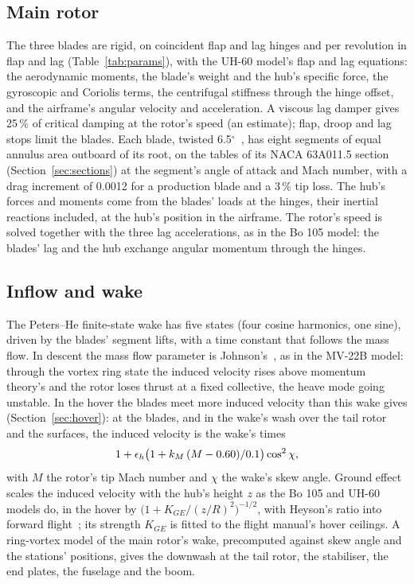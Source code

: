 \documentclass[10pt,a4paper,twocolumn]{article}
\begin{document}
\subsection{Main rotor}
The three blades are rigid, on coincident flap and lag hinges \NuFlap{} and \NuLag{} per revolution in flap and lag
(Table~\ref{tab:params}), with the UH-60 model's flap and lag equations: the aerodynamic moments, the blade's weight and the hub's
specific force, the gyroscopic and Coriolis terms, the centrifugal stiffness through the hinge offset, and the airframe's angular
velocity and acceleration. A viscous lag damper gives 25\,\% of critical damping at the rotor's speed (an estimate); flap, droop and lag
stops limit the blades. Each blade, twisted 6.5$^\circ$~\cite{hl}, has eight segments of equal annulus area outboard of its root, on the
tables of its NACA 63A011.5 section (Section~\ref{sec:sections}) at the segment's angle of attack and Mach number, with a drag
increment of 0.0012 for a production blade and a 3\,\% tip loss.
The hub's forces and moments come from the blades' loads at the hinges, their inertial reactions included, at the hub's position in the
airframe. The rotor's speed is solved together with the three lag accelerations, as in the Bo 105 model: the blades' lag and the hub
exchange angular momentum through the hinges.

\subsection{Inflow and wake}
The Peters--He finite-state wake has five states (four cosine harmonics, one sine), driven by the blades' segment lifts, with a time
constant that follows the mass flow. In descent the mass flow parameter is Johnson's~\cite{johnson}, as in the MV-22B model: through the
vortex ring state the induced velocity rises above momentum theory's and the rotor loses thrust at a fixed collective, the heave mode
going unstable. In the hover the blades meet more induced velocity than this wake gives (Section~\ref{sec:hover}): at the blades, and in
the wake's wash over the tail rotor and the surfaces, the induced velocity is the wake's times
\begin{equation*}
1+\epsilon_h\bigl(1+k_M\,(M-0.60)/0.1\bigr)\cos^2\chi ,
\end{equation*}
with $M$ the rotor's tip Mach number and $\chi$ the wake's skew angle. Ground effect scales the induced velocity with the hub's height
$z$ as the Bo 105 and UH-60 models do, in the hover by $\bigl(1+K_{GE}/(z/R)^2\bigr)^{-1/2}$, with Heyson's ratio into forward
flight~\cite{heyson}; its strength $K_{GE}$ is fitted to the flight manual's hover ceilings. A ring-vortex model of the main rotor's
wake, precomputed against skew angle and the stations' positions, gives the downwash at the tail rotor, the stabiliser, the end plates,
the fuselage and the boom.
\end{document}
